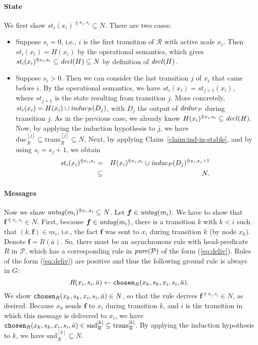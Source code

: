 \documentclass{tlp}
\newcommand{\ded}{\mathcal{P}}
\newcommand{\fc}{\boldsymbol{f}}
\newcommand{\addlt}[3]{#1^{\Uparrow#2,#3}}
\newcommand{\chosen}{\pred{chosen}}
\newcommand{\decl}[1]{\fname{decl}(#1)}
\newcommand{\pure}[1]{\fname{pure}(#1)}
\newcommand{\cnfs}{\mathit{st}}
\newcommand{\pair}[2]{(#1,#2)}
\newcommand{\run}{\mathcal{R}}
\newcommand{\untag}[1]{\fname{untag}(#1)}
\newcommand{\deduc}[1]{\fname{deduc}_{#1}}
\newcommand{\induc}[1]{\fname{induc}_{#1}}
\newcommand{\slice}[1]{\mathrm{trans}_{\run}^{[#1]}}
\newcommand{\sliceduc}[1]{\text{duc}_{\run}^{[#1]}}
\newcommand{\slicesnd}[1]{\text{snd}_{\run}^{[#1]}}
\newcommand{\grded}{G}
\begin{document}
\begin{appendix}
\paragraph*{State}

We first show $\addlt{\cnfs_{i}(x_{i})}{x_{i}}{s_{i}}\subseteq N$.
There are two cases:
\begin{itemize}
\item Suppose $s_{i}=0$, i.e., $i$ is the first transition of $\run$
with active node $x_{i}$. Then $\cnfs_{i}(x_{i})=H(x_{i})$ by the
operational semantics, which gives $\addlt{\cnfs_{i}(x_{i})}{x_{i}}{s_{i}}\subseteq\decl H\subseteq N$
by definition of $\decl H$.
\item Suppose $s_{i}>0$. Then we can consider the last transition $j$
of $x_{i}$ that came before $i$. By the operational semantics, we
have $\cnfs_{i}(x_{i})=\cnfs_{j+1}(x_{i})$, where $\cnfs_{j+1}$
is the state resulting from transition $j$. More concretely, $\cnfs_{i}(x_{i})=H(x_{i})\cup\induc{\ded}(D_{j})$,
with $D_{j}$ the output of $\deduc{\ded}$ during transition $j$.
As in the previous case, we already know $\addlt{H(x_{i})}{x_{i}}{s_{i}}\subseteq\decl H$.
Now, by applying the induction hypothesis to $j$, we have $\sliceduc j\subseteq\slice j\subseteq N$.
Next, by applying Claim~\ref{claim:ind-in-stable}, and by using
$s_{i}=s_{j}+1$, we obtain
\begin{eqnarray*}
\addlt{\cnfs_{i}(x_{i})}{x_{i}}{s_{i}} & = & \addlt{H(x_{i})}{x_{i}}{s_{i}}\cup\addlt{\induc{\ded}(D_{j})}{x_{i}}{s_{j}+1}\\
 & \subseteq & N.
\end{eqnarray*}

\end{itemize}

\paragraph*{Messages}

Now we show $\addlt{\untag{m_{i}}}{x_{i}}{s_{i}}\subseteq N$. Let
$\fc\in\untag{m_{i}}$. We have to show that $\addlt{\fc}{x_{i}}{s_{i}}\in N$.
First, because $\fc\in\untag{m_{i}}$, there is a transition $k$
with $k<i$ such that $\pair k{\fc}\in m_{i}$, i.e., the fact $\fc$
was sent to $x_{i}$ during transition $k$ (by node $x_{k}$). Denote
$\fc=R(\bar{a})$. So, there must be an asynchronous rule with head-predicate
$R$ in $\ded$, which has a corresponding rule in $\pure{\ded}$
of the form (\ref{eq:deliv}). Rules of the form (\ref{eq:deliv})
are positive and thus the following ground rule is always in $\grded$:
\[
R(x_{i},s_{i},\bar{a})\gets\chosen_{R}(x_{k},s_{k},x_{i},s_{i},\bar{a}).
\]
We show $\chosen_{R}(x_{k},s_{k},x_{i},s_{i},\bar{a})\in N$, so that
the rule derives $\addlt{\fc}{x_{i}}{s_{i}}\in N$, as desired. Because
$x_{k}$ sends $\fc$ to $x_{i}$ during transition $k$, and $i$
is the transition in which this message is delivered to $x_{i}$,
we have $\chosen_{R}(x_{k},s_{k},x_{i},s_{i},\bar{a})\in\slicesnd k\subseteq\slice k$.
By applying the induction hypothesis to $k$, we have $\slicesnd k\subseteq N$.



\end{appendix}
\end{document}
